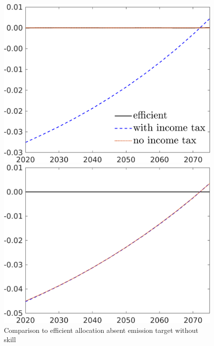 \begin{figure}[h!!]
	\centering
	\caption{Comparison to efficient allocation absent emission target without skill }\label{fig:Compno_eff_BN0_notarget_noskill}
	\begin{minipage}[]{0.32\textwidth}
		\includegraphics[width=1\textwidth]{../../codding_model/own_basedOnFried/optimalPol_elastS_DisuSci/figures/all_1705/taul_CompEffOPT_NOT_NoTaus_spillover0_noskill1_sep1_BN0_ineq0_red0_etaa0.79_lgd1.png}
	\end{minipage}
	\begin{minipage}[]{0.32\textwidth}
		\includegraphics[width=1\textwidth]{../../codding_model/own_basedOnFried/optimalPol_elastS_DisuSci/figures/all_1705/tauf_CompEffOPT_NOT_NoTaus_spillover0_noskill1_sep1_BN0_ineq0_red0_etaa0.79_lgd0.png}

\end{minipage}
\end{figure}
